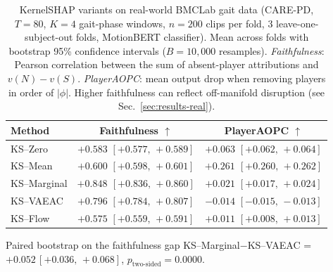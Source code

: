 \begin{table}[t]
\centering\small
\caption{KernelSHAP variants on real-world BMCLab gait data (CARE-PD, $T{=}80$, $K{=}4$ gait-phase windows, $n{=}200$ clips per fold, 3 leave-one-subject-out folds, MotionBERT classifier).  Mean across folds with bootstrap 95\% confidence intervals ($B{=}10{,}000$ resamples).  \textit{Faithfulness}: Pearson correlation between the sum of absent-player attributions and $v(N)\!-\!v(S)$.  \textit{PlayerAOPC}: mean output drop when removing players in order of $|\phi|$.  Higher faithfulness can reflect off-manifold disruption (see Sec.~\ref{sec:results-real}).}
\label{tab:real}
\begin{tabular}{lcc}
\toprule
Method & Faithfulness $\uparrow$ & PlayerAOPC $\uparrow$ \\
\midrule
KS--Zero & $+0.583$ $[+0.577,\,+0.589]$ & $+0.063$ $[+0.062,\,+0.064]$ \\
KS--Mean & $+0.600$ $[+0.598,\,+0.601]$ & \textbf{$+0.261$ $[+0.260,\,+0.262]$} \\
KS--Marginal & \textbf{$+0.848$ $[+0.836,\,+0.860]$} & $+0.021$ $[+0.017,\,+0.024]$ \\
KS--VAEAC & $+0.796$ $[+0.784,\,+0.807]$ & $-0.014$ $[-0.015,\,-0.013]$ \\
KS--Flow & $+0.575$ $[+0.559,\,+0.591]$ & $+0.011$ $[+0.008,\,+0.013]$ \\
\bottomrule
\end{tabular}
\vspace{0.5ex}\par\footnotesize Paired bootstrap on the faithfulness gap KS--Marginal$-$KS--VAEAC = $+0.052\,[+0.036,\,+0.068]$, $p_{\text{two-sided}}=0.0000$.
\end{table}
